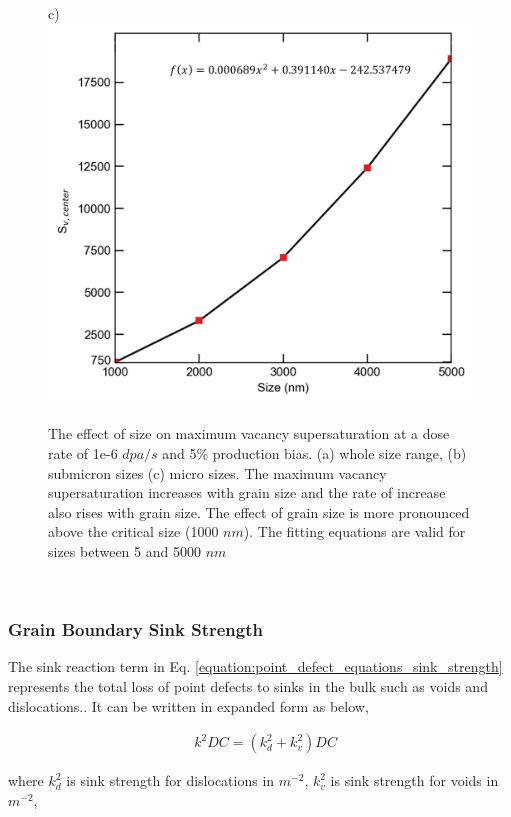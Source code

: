 \documentclass[utf8]{frontiersSCNS} %
\begin{document}
\begin{figure}[h!]
        c)\includegraphics[scale=0.55]{Fig8_c}
        \caption{The effect of size on maximum vacancy supersaturation at a dose rate of 1e-6 $dpa/s$ and 5\% production bias. (a) whole size range, (b) submicron sizes (c) micro sizes. The maximum vacancy supersaturation increases with grain size and the rate of increase also rises with grain size. The effect of grain size is more pronounced above the critical size (1000 $nm$). The fitting equations are valid for sizes between 5 and 5000 $nm$}
        \label{figure:center_vacancy_supersaturation_neutron}
    \end{figure}\\
\newpage
\subsubsection{Grain Boundary Sink Strength}
    The sink reaction term in Eq. \ref{equation:point_defect_equations_sink_strength} represents the total loss of point defects to sinks in the bulk such as voids and dislocations.. It can be written in expanded form as below,

    \begin{equation}
      \begin{aligned}
        &k^2DC=(k_d^2 + k_v^2)DC
      \end{aligned}
    \end{equation}
    
    where ${k_d^2}$ is sink strength for dislocations in $m^{-2}$, $ {k_v^2}$ is sink strength for voids in ${m^{-2}}$,\\
    
\end{document}
